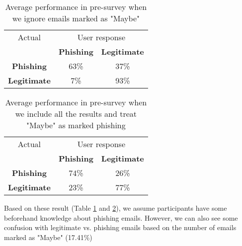 \begin{table}[!ht]
    \begin{center}

        \begin{tabular}{c | c c}
            Actual              & \multicolumn{2}{c}{User response}                       \\
                                & \textbf{Phishing}                 & \textbf{Legitimate} \\
            \textbf{Phishing}   & 63\%                              & 37\%                \\
            \textbf{Legitimate} & 7\%                               & 93\%                \\
        \end{tabular}
        \caption{Average performance in pre-survey when we ignore emails marked as "Maybe"}
        \label{tab:pre_survey_responses}
    \end{center}
\end{table}

\begin{table}[!ht]
    \begin{center}

        \begin{tabular}{c | c c}
            Actual              & \multicolumn{2}{c}{User response}                       \\
                                & \textbf{Phishing}                 & \textbf{Legitimate} \\
            \textbf{Phishing}   & 74\%                              & 26\%                \\
            \textbf{Legitimate} & 23\%                              & 77\%                \\
        \end{tabular}
        \caption{Average performance in pre-survey when we include all the results and treat "Maybe" as marked phishing}
        \label{tab:pre_survey_responses_all}
    \end{center}
\end{table}

Based on these result (Table \ref{tab:pre_survey_responses} and \ref{tab:pre_survey_responses_all}), we assume participants have some  beforehand knowledge about phishing emails. However, we can also see some confusion with legitimate vs. phishing emails based on the number of emails marked as "Maybe" (17.41\%)

